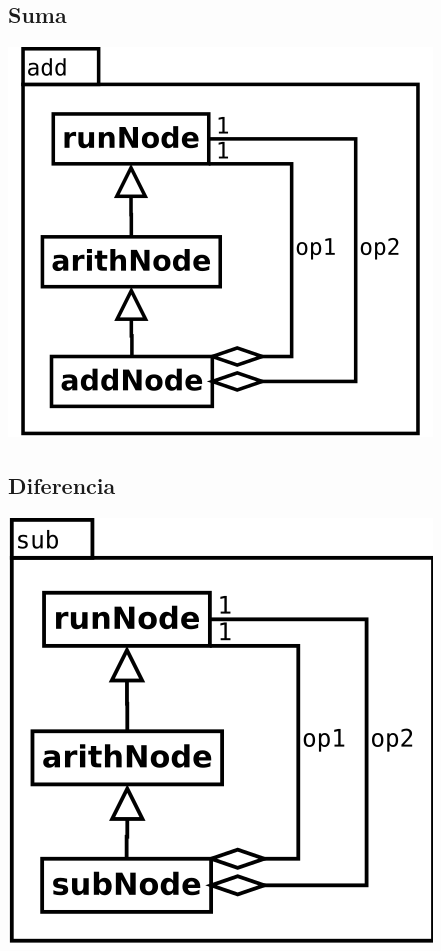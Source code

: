 \subsection {Suma}
\begin{center}
\includegraphics[scale=0.4]{add.png} \\
\end{center}

\subsection {Diferencia}
\begin{center}
\includegraphics[scale=0.4]{sub.png} \\
\end{center}

